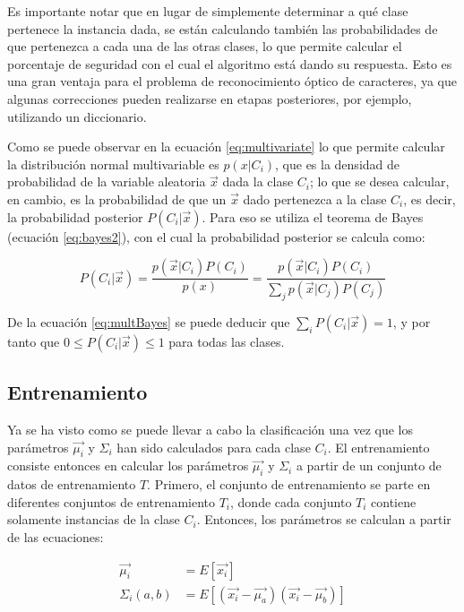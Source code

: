 \documentclass[a4paper, 11pt, oneside]{report}
\begin{document}
Es importante notar que en lugar de simplemente determinar a qué clase pertenece la instancia dada, se están calculando también las probabilidades de que pertenezca a cada una de las otras clases, lo que permite calcular el porcentaje de seguridad con el cual el algoritmo está dando su respuesta. Esto es una gran ventaja para el problema de reconocimiento óptico de caracteres, ya que algunas correcciones pueden realizarse en etapas posteriores, por ejemplo, utilizando un diccionario.

Como se puede observar en la ecuación \eqref{eq:multivariate} lo que permite calcular la distribución normal multivariable es $p(x|C_i)$, que es la densidad de probabilidad de la variable aleatoria $\vec{x}$ dada la clase $C_i$; lo que se desea calcular, en cambio, es la probabilidad de que un $\vec{x}$ dado pertenezca a la clase $C_i$, es decir, la probabilidad posterior $P(C_i|\vec{x})$. Para eso se utiliza el teorema de Bayes (ecuación \ref{eq:bayes2}), con el cual la probabilidad posterior se calcula como:

	\begin{equation}\label{eq:multBayes}
		P(C_i|\vec{x}) = \frac{p(\vec{x}|C_i)P(C_i)}{p(x)} = \frac{p(\vec{x}|C_i)P(C_i)}{ \sum_j{p(\vec{x}|C_j)P(C_j)} }
	\end{equation}
	
De la ecuación \ref{eq:multBayes} se puede deducir que $\sum_i{P(C_i|\vec{x})}=1$, y por tanto que $0 \le P(C_i|\vec{x}) \le 1$ para todas las clases.
	
\subsection{Entrenamiento}

Ya se ha visto como se puede llevar a cabo la clasificación una vez que los parámetros $\vec{\mu_i}$ y $\Sigma_i$ han sido calculados para cada clase $C_i$. El entrenamiento consiste entonces en calcular los parámetros $\vec{\mu_i}$ y $\Sigma_i$ a partir de un conjunto de datos de entrenamiento $T$. Primero, el conjunto de entrenamiento se parte en diferentes conjuntos de entrenamiento $T_i$, donde cada conjunto $T_i$ contiene solamente instancias de la clase $C_i$. Entonces, los parámetros se calculan a partir de las ecuaciones:

	\begin{equation}\label{eq:multiParams}
	\begin{aligned}
		\vec{\mu_i} &= E[ \vec{x_i} ] \\
		\Sigma_i(a,b) &= E[ (\vec{x_i}-\vec{\mu_a})(\vec{x_i}-\vec{\mu_b}) ]
	\end{aligned}
	\end{equation}
\end{document}
